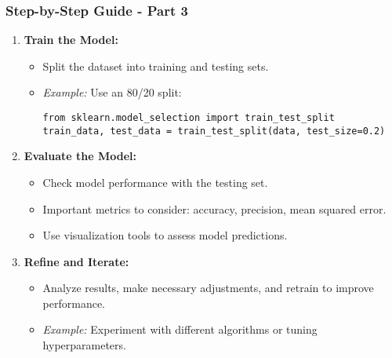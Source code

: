 \documentclass[aspectratio=169]{beamer}
\begin{document}
\begin{frame}[fragile]
    \frametitle{Step-by-Step Guide - Part 3}
    \begin{enumerate}[resume]
        \item \textbf{Train the Model:}
        \begin{itemize}
            \item Split the dataset into training and testing sets.
            \item \textit{Example:} Use an 80/20 split:
            \begin{lstlisting}
from sklearn.model_selection import train_test_split
train_data, test_data = train_test_split(data, test_size=0.2)
            \end{lstlisting}
        \end{itemize}

        \item \textbf{Evaluate the Model:}
        \begin{itemize}
            \item Check model performance with the testing set.
            \item Important metrics to consider: accuracy, precision, mean squared error.
            \item Use visualization tools to assess model predictions.
        \end{itemize}

        \item \textbf{Refine and Iterate:}
        \begin{itemize}
            \item Analyze results, make necessary adjustments, and retrain to improve performance.
            \item \textit{Example:} Experiment with different algorithms or tuning hyperparameters.
        \end{itemize}
    \end{enumerate}
\end{frame}
\end{document}
